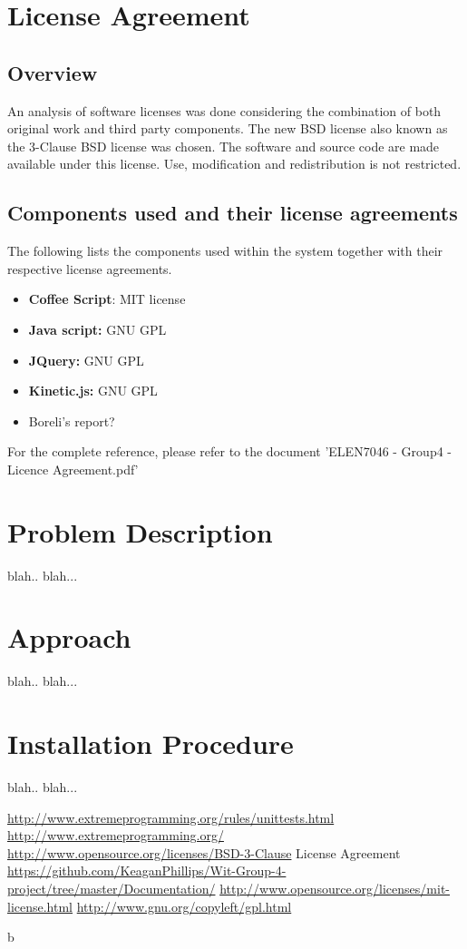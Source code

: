 \documentclass[a4paper,12pt]{article}
\begin{document}
\section{License Agreement}
\subsection{Overview}
An analysis of software licenses was done considering the combination of both original work and third party components. The new BSD license also known as the 3-Clause BSD\cite{bds} license was chosen. The software and source code are made available under this license. Use, modification and redistribution is not restricted. 
\subsection{Components used and their license agreements}
The following lists the components used within the system together with their respective license agreements.
\begin{itemize}
\item \textbf{Coffee Script}: MIT license\cite{mit}
\item \textbf{Java script:} GNU GPL\cite{gnugpl}
\item \textbf{JQuery:} GNU GPL\cite{gnugpl}
\item \textbf{Kinetic.js:} GNU GPL\cite{gnugpl}
\item Boreli's report?
\end{itemize}

For the complete reference, please refer to the document 'ELEN7046 - Group4 - Licence Agreement.pdf'\cite{licenceDoc}

\section{Problem Description}
blah.. blah...

\section{Approach}
blah.. blah...

\section{Installation Procedure}
blah.. blah...


\clearpage
\begin{thebibliography}{5}
 \url{http://www.extremeprogramming.org/rules/unittests.html}
 \url{http://www.extremeprogramming.org/}
 \url{http://www.opensource.org/licenses/BSD-3-Clause}
 License Agreement  \url{https://github.com/KeaganPhillips/Wit-Group-4-project/tree/master/Documentation/}
 \url{http://www.opensource.org/licenses/mit-license.html}
 \url{http://www.gnu.org/copyleft/gpl.html}


 b \url{}
\end{thebibliography}

 
\end{document}
